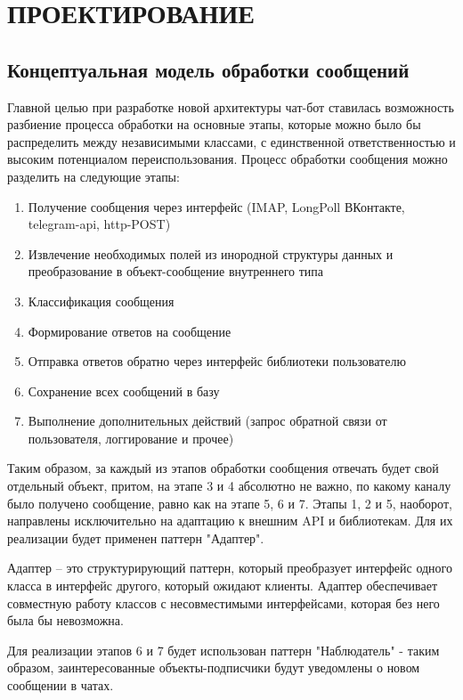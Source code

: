 \section{ПРОЕКТИРОВАНИЕ}
    \subsection{Концептуальная модель обработки сообщений}
    Главной целью при разработке новой архитектуры чат-бот ставилась возможность
    разбиение процесса обработки на основные этапы, которые можно было бы
    распределить между независимыми классами, с единственной ответственностью и
    высоким потенциалом переиспользования.
    Процесс обработки сообщения можно разделить на следующие этапы:
    \begin{enumerate}
        \item Получение сообщения через интерфейс (IMAP, LongPoll ВКонтакте, 
        telegram-api, http-POST)
        \item Извлечение необходимых полей из инородной структуры данных и 
        преобразование в объект-сообщение внутреннего типа
        \item Классификация сообщения
        \item Формирование ответов на сообщение
        \item Отправка ответов обратно через интерфейс библиотеки пользователю
        \item Сохранение всех сообщений в базу
        \item Выполнение дополнительных действий (запрос обратной связи от
        пользователя, логгирование и прочее)
    \end{enumerate}

    Таким образом, за каждый из этапов обработки сообщения отвечать будет свой 
    отдельный объект, притом, на этапе 3 и 4 абсолютно не важно, по какому 
    каналу было получено сообщение, равно как на этапе 5, 6 и 7. Этапы 1, 2 и 5, 
    наоборот, направлены исключительно на адаптацию к внешним API и библиотекам.
    Для их реализации будет применен паттерн "Адаптер". 
    
    Адаптер -- это структурирующий паттерн, который 
    преобразует интерфейс одного класса в интерфейс другого, который ожидают
    клиенты. Адаптер обеспечивает совместную работу классов с несовместимыми
    интерфейсами, которая без него была бы невозможна.
    
    Для реализации этапов
    6 и 7 будет использован паттерн "Наблюдатель" - таким образом,
    заинтересованные объекты-подписчики будут уведомлены о новом сообщении в чатах.
    
